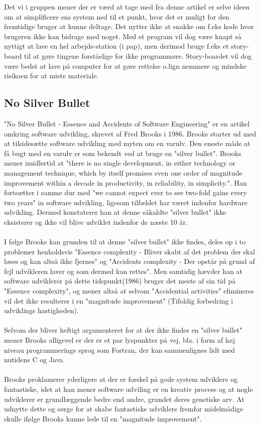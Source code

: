 \documentclass[12pt]{article}
\begin{document}
Det vi i gruppen mener der er værd at tage med fra denne artikel er selve ideen om at simplificere ens system ned til et punkt, hvor det er muligt for den fremtidige bruger at kunne deltage. Det nytter ikke at snakke om f.eks kode hvor brugeren ikke kan bidrage med noget. Med et program vil dog være knapt så nyttigt at lave en hel arbejds-station (i pap), men derimod bruge f.eks et story-board til at gøre tingene forståelige for ikke programmøre. Story-boardet vil dog være bedst at lave på computer for at gøre rettelse o.lign nemmere og mindske risikoen for at miste materiale.

\pagebreak
\subsection{No Silver Bullet}

"No Silver Bullet - Essence and Accidents of Software Engineering" er en artikel omkring software udvikling, skrevet af Fred Brooks i 1986. Brooks starter ud med at tilsidesætte software udvikling med myten om en varulv. Den eneste måde at få bugt med en varulv er som bekendt ved at bruge en "silver bullet". Brooks mener imidlertid  at  "there is no single development, in either technology or management technique, which by itself promises even one order of magnitude improvement within a decade in productivity, in reliability, in simplicity.". Han fortsætter i samme dur med "we cannot expect ever to see two-fold gains every two years" in software udvikling, ligesom tilfældet har været indenfor hardware udvikling. Dermed konstaterer han at denne såkaldte "silver bullet" ikke eksisterer og ikke vil blive udviklet indenfor de næste 10 år.\\\\
I følge Brooks kan grunden til at denne "silver bullet"  ikke findes, deles op i to problemer henholdsvis "Essence complexity - Bliver skabt af det problem der skal løses og kan altså ikke fjernes" og "Accidents complexity - Der opstår på grund af fejl udvikleren laver og som dermed kan rettes". Men samtidig hævder han at software udviklerer på dette tidspunkt(1986) bruger det meste af sin tid på "Essence complexity", og mener altså at selvom "Accidential activities" elimineres vil det ikke resulterer i en "magnitude improvement" (Tifoldig forbedring i udviklings hastigheden).  \\\\
Selvom der bliver heftigt argumenteret for at der ikke findes en "silver bullet" mener Brooks alligevel er der er et par lyspunkter på vej, bla. i form af høj niveau programmerings sprog som Fortran, der kan sammenlignes lidt med nutidens C og Java. \\\\
Brooks proklamerer yderligere at der er forskel på gode system udviklere og fantastiske, idet at han mener software udviling er en kreativ process og at nogle udviklerer er grundlæggende bedre end andre, grundet deres genetiske arv. At udnytte dette og sørge for at skabe fantastiske udviklere fremfor midelmådige skulle ifølge Brooks kunne lede til en "magnitude improvement".\\\\
\newpage
\end{document}

